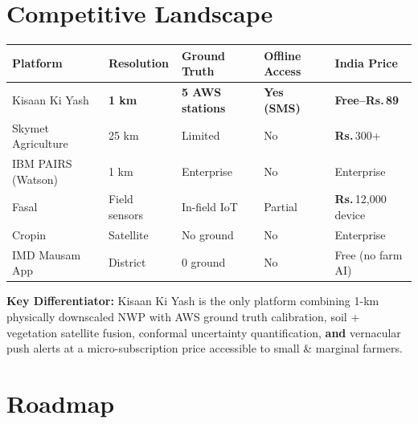 \documentclass[12pt,a4paper]{article}
\newcommand{\Rup}{\textbf{Rs.\,}}
\begin{document}
\section{Competitive Landscape}

\begin{center}
\small
\renewcommand{\arraystretch}{1.4}
\begin{tabular}{|p{3.5cm}|p{2cm}|p{2cm}|p{2cm}|p{2.5cm}|}
\hline
\rowcolor{primaryGreen}
\textbf{\color{white}Platform} & \textbf{\color{white}Resolution} & \textbf{\color{white}Ground Truth} & \textbf{\color{white}Offline Access} & \textbf{\color{white}India Price} \\
\hline
Kisaan Ki Yash & \textbf{1 km} & \textbf{5 AWS stations} & \textbf{Yes (SMS)} & \textbf{Free--\Rup 89} \\
\hline
Skymet Agriculture & 25 km & Limited & No & \Rup 300+ \\
\hline
IBM PAIRS (Watson) & 1 km & Enterprise & No & Enterprise \\
\hline
Fasal & Field sensors & In-field IoT & Partial & \Rup 12,000 device \\
\hline
Cropin & Satellite & No ground & No & Enterprise \\
\hline
IMD Mausam App & District & 0 ground & No & Free (no farm AI) \\
\hline
\end{tabular}
\end{center}

\textbf{Key Differentiator:} Kisaan Ki Yash is the only platform combining 1-km physically downscaled NWP with AWS ground truth calibration, soil + vegetation satellite fusion, conformal uncertainty quantification, \textbf{and} vernacular push alerts at a micro-subscription price accessible to small \& marginal farmers.

\section{Roadmap}
\end{document}
